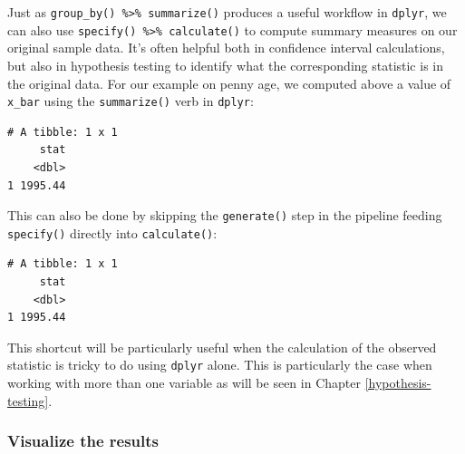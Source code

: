 \documentclass[12pt, krantz2,]{krantz}
\makeatletter
\newenvironment{Shaded}{\begin{snugshade}}{\end{snugshade}}
\newcommand{\DataTypeTok}[1]{\textcolor[rgb]{0.27,0.27,0.27}{#1}}
\newcommand{\DecValTok}[1]{\textcolor[rgb]{0.06,0.06,0.06}{#1}}
\newcommand{\KeywordTok}[1]{\textcolor[rgb]{0.27,0.27,0.27}{\textbf{#1}}}
\newcommand{\NormalTok}[1]{#1}
\newcommand{\OperatorTok}[1]{\textcolor[rgb]{0.43,0.43,0.43}{\textbf{#1}}}
\newcommand{\StringTok}[1]{\textcolor[rgb]{0.5,0.5,0.5}{#1}}
\newenvironment{kframe}{%
\medskip{}
\setlength{\fboxsep}{.8em}
 \def\at@end@of@kframe{}%
 \ifinner\ifhmode%
  \def\at@end@of@kframe{\end{minipage}}%
  \begin{minipage}{\columnwidth}%
 \fi\fi%
 \def\FrameCommand##1{\hskip\@totalleftmargin \hskip-\fboxsep
 \colorbox{shadecolor}{##1}\hskip-\fboxsep
     \hskip-\linewidth \hskip-\@totalleftmargin \hskip\columnwidth}%
 \MakeFramed {\advance\hsize-\width
   \@totalleftmargin\z@ \linewidth\hsize
   \@setminipage}}%
 {\par\unskip\endMakeFramed%
 \at@end@of@kframe}
\renewenvironment{Shaded}{\begin{kframe}}{\end{kframe}}
\makeatother
\begin{document}
Just as \texttt{group\_by()\ \%\textgreater{}\%\ summarize()} produces a useful workflow in \texttt{dplyr}, we can also use \texttt{specify()\ \%\textgreater{}\%\ calculate()} to compute summary measures on our original sample data. It's often helpful both in confidence interval calculations, but also in hypothesis testing to identify what the corresponding statistic is in the original data. For our example on penny age, we computed above a value of \texttt{x\_bar} using the \texttt{summarize()} verb in \texttt{dplyr}:

\begin{Shaded}
\end{Shaded}

\begin{verbatim}
# A tibble: 1 x 1
     stat
    <dbl>
1 1995.44
\end{verbatim}

This can also be done by skipping the \texttt{generate()} step in the pipeline feeding \texttt{specify()} directly into \texttt{calculate()}:

\begin{Shaded}
\end{Shaded}

\begin{verbatim}
# A tibble: 1 x 1
     stat
    <dbl>
1 1995.44
\end{verbatim}

This shortcut will be particularly useful when the calculation of the observed statistic is tricky to do using \texttt{dplyr} alone. This is particularly the case when working with more than one variable as will be seen in Chapter \ref{hypothesis-testing}.

\hypertarget{visualize-the-results}{%
\subsubsection*{Visualize the results}\label{visualize-the-results}}
\end{document}
